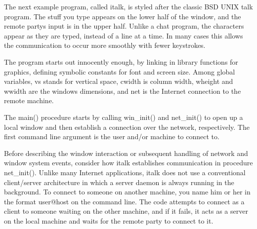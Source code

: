 The next example program, called \textsf{italk}, is styled after the
classic BSD UNIX \textsf{talk} program. The stuff you type
appears on the lower half of the window, and the remote
party{\textquotesingle}s input is in the upper half. Unlike a chat
program, the characters appear as they are typed, instead of a line at
a time. In many cases this allows the communication to occur more
smoothly with fewer keystrokes.

The program starts out innocently enough, by linking in library
functions for graphics, defining symbolic constants for font and screen
size. Among global variables, \textsf{vs} stands for vertical space,
\textsf{cwidth} is column width, \textsf{wheight} and \textsf{wwidth}
are the window{\textquotesingle}s dimensions, and \textsf{net} is the
Internet connection to the remote machine.


The \textsf{main()} procedure starts by calling \textsf{win\_init()} and
\textsf{net\_init()} to open up a local window and then establish a
connection over the network, respectively. The first command line
argument is the user and/or machine to connect to.


Before describing the window interaction or subsequent handling of
network and window system events, consider how \textsf{italk}
establishes communication in procedure \textsf{net\_init()}. Unlike
many Internet applications, \textsf{italk} does not use a conventional
client/server architecture in which a server daemon is always running
in the background. To connect to someone on another machine, you name
him or her in the format \textsf{user@host} on the command line. The
code attempts to connect as a client to someone waiting on the other
machine, and if it fails, it acts as a server on the local machine and
waits for the remote party to connect to it.

